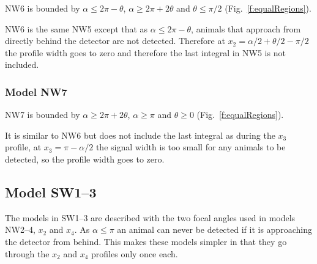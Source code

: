 NW6 is bounded by $\alpha \le 2\pi - \theta$, $\alpha \ge 2\pi + 2\theta$ and $\theta \le \pi/2$ (Fig.~\ref{f:equalRegions}).

NW6 is the same NW5 except that as $\alpha \le 2\pi - \theta$, animals that approach from directly behind the detector are not detected. Therefore at $x_2 = \alpha/2 + \theta/2 - \pi/2$ the profile width goes to zero and therefore the last integral in NW5 is not included.





\subsubsection{Model NW7} \label{NW7}

NW7 is bounded by $\alpha \ge 2\pi + 2\theta$, $\alpha \ge \pi$ and $\theta \ge 0$ (Fig.~\ref{f:equalRegions}).

It is similar to NW6 but does not include the last integral as during the $x_3$ profile, at $x_3 = \pi - \alpha/2$ the signal width is too small for any animals to be detected, so the profile width goes to zero.







\subsection{Model SW1--3} \label{SW13}
 
The models in SW1--3 are described with the two focal angles used in models NW2--4, $x_2$ and $x_4$. As $\alpha \le\pi$ an animal can never be detected if it is approaching the detector from behind. This makes these models simpler in that they go through the $x_2$ and $x_4$ profiles only once each. 

